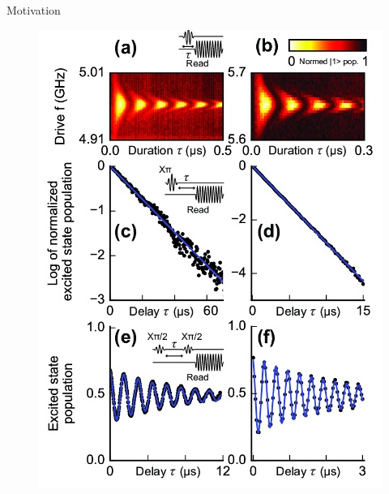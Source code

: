 \documentclass[11p,aspectratio=169]{beamer}
\begin{document}
\begin{frame}{Motivation}
            \begin{multicols*}{2}
                \begin{figure}
                    \includegraphics[height = 0.7 \textheight]{figures/characterization.png}
                \end{figure}


\end{multicols*}
\end{frame}
\end{document}
